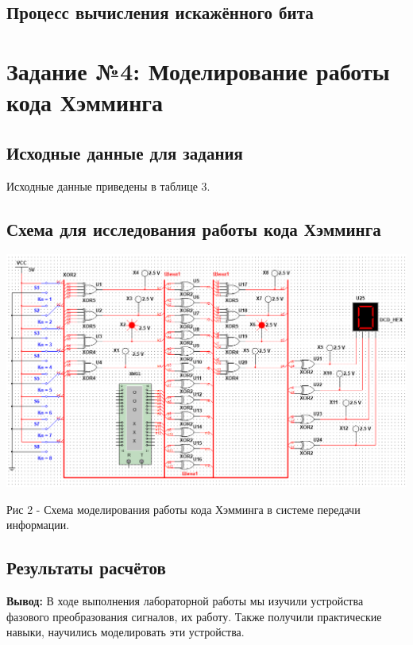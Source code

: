 \documentclass[11pt]{article}
\begin{document}
\subsection{Процесс вычисления искажённого бита}


\newpage
\section{Задание №4: Моделирование работы кода Хэмминга}
\subsection{Исходные данные для задания}
Исходные данные приведены в таблице 3.
\subsection{Схема для исследования работы кода Хэмминга}
\includegraphics[width=1\linewidth]{img/scheme2.png}
\begin{center}
        Рис 2 - Схема моделирования работы кода Хэмминга в системе передачи информации.
\end{center}

\subsection{Результаты расчётов}

\textbf{Вывод:} В ходе выполнения лабораторной работы мы изучили устройства фазового преобразования сигналов, их работу. Также получили практические навыки, научились моделировать эти устройства.
\end{document}
